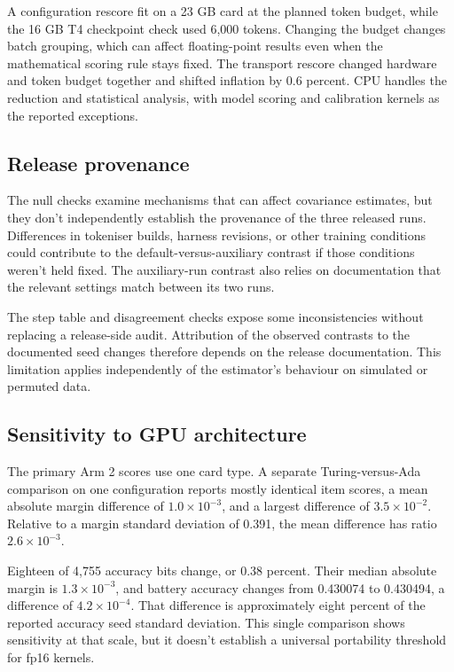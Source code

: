 A configuration rescore fit on a 23 GB card at the planned token budget, while the 16 GB T4 checkpoint check used 6,000 tokens. Changing the budget changes batch grouping, which can affect floating-point results even when the mathematical scoring rule stays fixed. The transport rescore changed hardware and token budget together and shifted inflation by 0.6 percent. CPU handles the reduction and statistical analysis, with model scoring and calibration kernels as the reported exceptions.

\subsection{Release provenance}
The null checks examine mechanisms that can affect covariance estimates, but they don't independently establish the provenance of the three released runs. Differences in tokeniser builds, harness revisions, or other training conditions could contribute to the default-versus-auxiliary contrast if those conditions weren't held fixed. The auxiliary-run contrast also relies on documentation that the relevant settings match between its two runs.

The step table and disagreement checks expose some inconsistencies without replacing a release-side audit. Attribution of the observed contrasts to the documented seed changes therefore depends on the release documentation. This limitation applies independently of the estimator's behaviour on simulated or permuted data.

\subsection{Sensitivity to GPU architecture}
The primary Arm 2 scores use one card type. A separate Turing-versus-Ada comparison on one configuration reports mostly identical item scores, a mean absolute margin difference of $1.0\times10^{-3}$, and a largest difference of $3.5\times10^{-2}$. Relative to a margin standard deviation of 0.391, the mean difference has ratio $2.6\times10^{-3}$.

Eighteen of 4,755 accuracy bits change, or 0.38 percent. Their median absolute margin is $1.3\times10^{-3}$, and battery accuracy changes from 0.430074 to 0.430494, a difference of $4.2\times10^{-4}$. That difference is approximately eight percent of the reported accuracy seed standard deviation. This single comparison shows sensitivity at that scale, but it doesn't establish a universal portability threshold for fp16 kernels.

